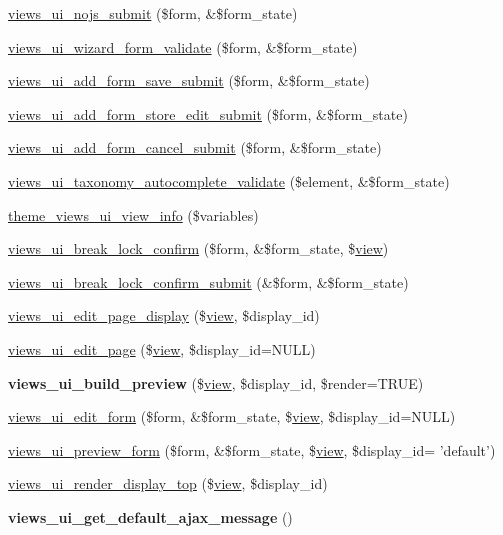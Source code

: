 \begin{DoxyCompactItemize}
\item 
\hyperlink{admin_8inc_a1cfe16d961eb27f67d7a82b90e6ea397}{views\_\-ui\_\-nojs\_\-submit} (\$form, \&\$form\_\-state)
\item 
\hyperlink{admin_8inc_afe05234475107bed1bf649135bb7b4be}{views\_\-ui\_\-wizard\_\-form\_\-validate} (\$form, \&\$form\_\-state)
\item 
\hyperlink{admin_8inc_ac60900b322b65e56855a469e0d412877}{views\_\-ui\_\-add\_\-form\_\-save\_\-submit} (\$form, \&\$form\_\-state)
\item 
\hyperlink{admin_8inc_ab93f3ab13bdb205a076d0d6d1ae95f9e}{views\_\-ui\_\-add\_\-form\_\-store\_\-edit\_\-submit} (\$form, \&\$form\_\-state)
\item 
\hyperlink{admin_8inc_aa9704c35f74a5657fb704af30d149420}{views\_\-ui\_\-add\_\-form\_\-cancel\_\-submit} (\$form, \&\$form\_\-state)
\item 
\hyperlink{admin_8inc_ab2dd568a1f97cc0fbbc8bbe61ae2f906}{views\_\-ui\_\-taxonomy\_\-autocomplete\_\-validate} (\$element, \&\$form\_\-state)
\item 
\hyperlink{admin_8inc_ae33cf97db5411d888f7bebca4521d3df}{theme\_\-views\_\-ui\_\-view\_\-info} (\$variables)
\item 
\hyperlink{admin_8inc_ab3dce1eb9283a346676043461ef544cc}{views\_\-ui\_\-break\_\-lock\_\-confirm} (\$form, \&\$form\_\-state, \$\hyperlink{classview}{view})
\item 
\hyperlink{admin_8inc_ac4e4cf7b38cbca3119949d164226ab93}{views\_\-ui\_\-break\_\-lock\_\-confirm\_\-submit} (\&\$form, \&\$form\_\-state)
\item 
\hyperlink{admin_8inc_a045ae05a3c8355d168425698b57a44ad}{views\_\-ui\_\-edit\_\-page\_\-display} (\$\hyperlink{classview}{view}, \$display\_\-id)
\item 
\hyperlink{admin_8inc_ac6af463750fb21984d42b858c446635c}{views\_\-ui\_\-edit\_\-page} (\$\hyperlink{classview}{view}, \$display\_\-id=NULL)
\item 
\hypertarget{admin_8inc_af2fcc46b7dd0371c120a5f7e851fb7bd}{
{\bfseries views\_\-ui\_\-build\_\-preview} (\$\hyperlink{classview}{view}, \$display\_\-id, \$render=TRUE)}
\label{admin_8inc_af2fcc46b7dd0371c120a5f7e851fb7bd}

\item 
\hyperlink{admin_8inc_a3c7bbae87e55e6a531c04c8135bd1231}{views\_\-ui\_\-edit\_\-form} (\$form, \&\$form\_\-state, \$\hyperlink{classview}{view}, \$display\_\-id=NULL)
\item 
\hyperlink{admin_8inc_a3e4c31bc14506f1f3ed444dc42041b06}{views\_\-ui\_\-preview\_\-form} (\$form, \&\$form\_\-state, \$\hyperlink{classview}{view}, \$display\_\-id= 'default')
\item 
\hyperlink{admin_8inc_a54f35232b2bafdf4b16ef6e1a9547d22}{views\_\-ui\_\-render\_\-display\_\-top} (\$\hyperlink{classview}{view}, \$display\_\-id)
\item 
\hypertarget{admin_8inc_af0d83f533494a5086875821316c2e9df}{
{\bfseries views\_\-ui\_\-get\_\-default\_\-ajax\_\-message} ()}
\label{admin_8inc_af0d83f533494a5086875821316c2e9df}


\end{DoxyCompactItemize}
